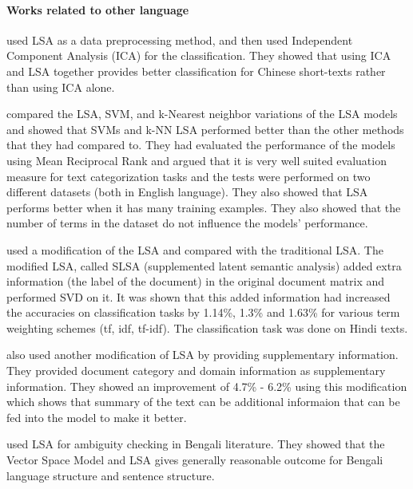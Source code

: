 \documentclass[12pt]{report}
\begin{document}
                    \paragraph{Works related to other language}
                            \cite{pu2006short} used LSA as a data preprocessing method, and then used Independent Component Analysis (ICA) for the classification. They showed that 
                            using ICA and LSA together provides better classification for Chinese short-texts rather than using ICA alone. 
                            
                            \cite{cardoso2003empirical} compared the LSA, SVM, and k-Nearest neighbor variations of the LSA models and showed that SVMs and k-NN LSA performed better 
                            than the other methods that they had compared to. They had evaluated the performance of the models using Mean Reciprocal Rank and argued that it is very well
                            suited evaluation measure for text categorization tasks and the tests were performed on two different datasets (both in English language). They also showed that LSA performs better 
                            when it has many training examples. They also showed that the number of terms in the dataset do not influence the models' performance. 

                            \cite{krishnamurthi2017including} used a modification of the LSA and compared with the traditional LSA. The modified LSA, called
                            SLSA (supplemented latent semantic analysis) added extra information (the label of the document) in the original document matrix 
                            and performed SVD on it. It was shown that this added information had increased the accuracies on classification tasks by 1.14\%, 1.3\% 
                            and 1.63\% for various term weighting schemes (tf, idf, tf-idf). The classification task was done on Hindi texts. 

                            \cite{krishnamurthi2016understanding} also used another modification of LSA by providing supplementary information. They provided 
                            document category and domain information as supplementary information. They showed an improvement of 4.7\% - 6.2\% using this modification which shows that 
                            summary of the text can be additional informaion that can be fed into the model to make it better.

                            \cite{nipu2017machine} used LSA for ambiguity checking in Bengali literature. They showed that the Vector Space Model and LSA gives generally reasonable
                            outcome for Bengali language structure and sentence structure. 
\end{document}
